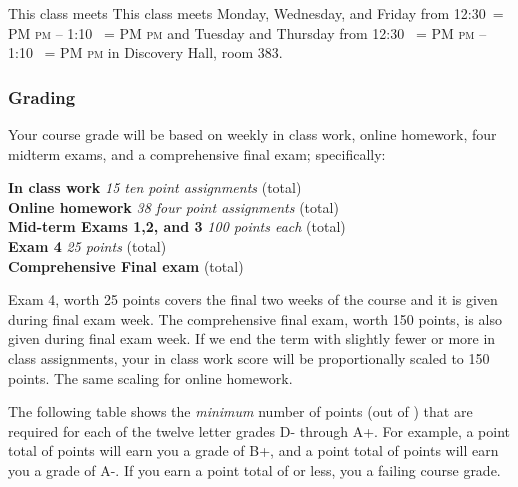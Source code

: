 \documentclass[12pt]{article}
\makeatletter
\newcounter{ex}\setcounter{ex}{0}
\newenvironment{mypar}[2]
  {\begin{list}{}%
    {\setlength\leftmargin{#1}
    \setlength\rightmargin{#2}}
    \item[]}
  {\end{list}}
\DeclareRobustCommand{\maybefakesc}[1]{%
  \ifnum\pdfstrcmp{\f@series}{\bfdefault}=\z@
    {\fontsize{\dimexpr0.8\dimexpr\f@size pt\relax}{0}\selectfont\uppercase{#1}}%
  \else
    \textsc{#1}%
  \fi
}
\newcommand\PM{\,\maybefakesc{pm}\xspace}
\newcommand{\room}{Discovery Hall, room  383}
\newcommand{\meetingtime}{This class meets Monday, Wednesday, and Friday  from 
	12:30\PM{}  --  1:10 \PM and Tuesday and Thursday from 12:30 \PM{} -- 1:10 \PM }
\makeatother
\begin{document}
This class meets \meetingtime{} in \room.


\subsubsection*{Grading}

Your course grade will be based on weekly in class work, online homework, four midterm exams, and a comprehensive 
final exam; specifically:
\begin{mypar}{0.25in}{0.25in}
    \textbf{In class work}  \emph{15 ten point assignments}   (total) \\
     \textbf{Online homework} \emph{38 four point assignments } (total)\\
    \textbf{Mid-term Exams 1,2, and 3} \emph{100 points each}  (total)\\
   \textbf{Exam 4} \emph{25 points}  (total)\\ 
      \textbf{Comprehensive Final exam}  (total)
\end{mypar}
Exam 4, worth 25 points covers the final two weeks of the course and it is given 
during final exam week. The comprehensive final exam, worth 150 points, is also 
given during final exam week. If we end the term with slightly fewer or more in class
assignments, your in class work score will be proportionally scaled to 150 points. The same 
scaling for online homework.






The following table shows the \emph{minimum} number of points (out of \points) that
are required for each of the twelve letter grades D- through A+. For
example, a point total of \Bp\/  points will earn you a grade of B+,  and 
a point total of \Am\/ points will earn you a grade of A-. If you earn a point
total of \F\/  or less, you a failing course grade.
 
\end{document}
